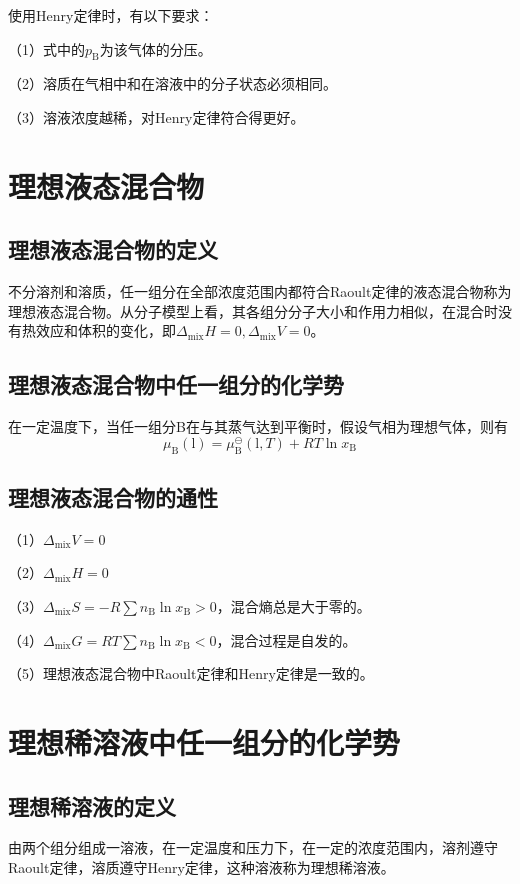 \documentclass[lang=cn,newtx,10pt,scheme=chinese]{elegantbook}
\begin{document}
使用Henry定律时，有以下要求：

（1）式中的$p_\mathrm{B}$为该气体的分压。

（2）溶质在气相中和在溶液中的分子状态必须相同。

（3）溶液浓度越稀，对Henry定律符合得更好。

\section{理想液态混合物}
\subsection{理想液态混合物的定义}
不分溶剂和溶质，任一组分在全部浓度范围内都符合Raoult定律的液态混合物称为理想液态混合物。从分子模型上看，其各组分分子大小和作用力相似，在混合时没有热效应和体积的变化，即$\Delta_\mathrm{mix}H=0,\Delta_\mathrm{mix}V=0$。

\subsection{理想液态混合物中任一组分的化学势}
在一定温度下，当任一组分B在与其蒸气达到平衡时，假设气相为理想气体，则有
\begin{equation}
	\mu_\mathrm{B}(\mathrm{l}) = \mu_\mathrm{B}^\ominus(\mathrm{l},T)+RT\ln x_\mathrm{B}
\end{equation}

\subsection{理想液态混合物的通性}
（1）$\Delta_\mathrm{mix} V=0$

（2）$\Delta_\mathrm{mix} H=0$

（3）$\Delta_\mathrm{mix} S=-R \sum n_\mathrm{B}\ln x_\mathrm{B} > 0$，混合熵总是大于零的。

（4）$\Delta_\mathrm{mix} G = RT\sum n_\mathrm{B}\ln x_\mathrm{B} < 0$，混合过程是自发的。

（5）理想液态混合物中Raoult定律和Henry定律是一致的。

\section{理想稀溶液中任一组分的化学势}
\subsection{理想稀溶液的定义}
由两个组分组成一溶液，在一定温度和压力下，在一定的浓度范围内，溶剂遵守Raoult定律，溶质遵守Henry定律，这种溶液称为理想稀溶液。
\end{document}
